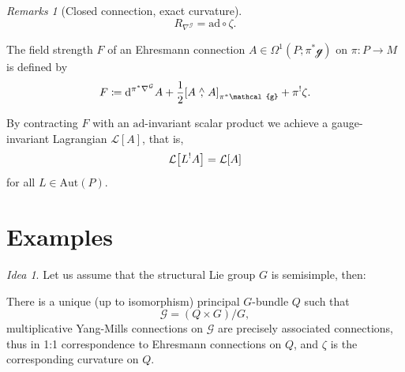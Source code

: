 \documentclass[
aspectratio=3218, 
10pt
]{beamer}
\def\bes{\begin{equation*}}
\def\ees{\end{equation*}}
\theoremstyle{plain}
\theoremstyle{remark}
\newtheorem*{remark}{Remarks}
\newtheorem*{idea}{Idea}
\begin{document}
{\begin{frame}
\pause

\begin{remark}[Closed connection, exact curvature]
\bes
R_{\nabla^{\mathcal{G}}} = \mathup{ad} \circ \zeta.
\ees
\end{remark}
\end{frame}

\begin{frame}
\begin{definition}\vspace{.5pt}
The field strength $F$ of an Ehresmann connection $A \in \Omega^1(P; \pi^*\mathcal{g})$ on $\pi \colon P \to M$ is defined by 
\bes
F
\coloneqq
\mathrm{d}^{\pi^*\nabla^{\mathcal{G}}} A
	+ \frac{1}{2} \mleft[ A \stackrel{\wedge}{,} A \mright]_{\pi^*\mathcal{g}}
	+ \pi^!\zeta.
\ees
\end{definition}
\pause
\begin{theorem}\vspace{.5pt}
By contracting $F$ with an $\mathup{ad}$-invariant scalar product we achieve a gauge-invariant Lagrangian $\mathcal{L}[A]$, that is,
\bes
\mathcal{L}\mleft[L^!A\mright]
=
\mathcal{L}[A]
\ees
for all $L \in \mathup{Aut}(P)$.
\end{theorem}
\end{frame}

\section{Examples}


\begin{frame}
\begin{idea}
Let us assume that the structural Lie group $G$ is semisimple, then:
\end{idea}

\begin{theorem}\vspace{.5pt}
There is a unique (up to isomorphism) principal $G$-bundle $Q$ such that 
\bes
\mathcal{G} = (Q\times G) \Big/ G,
\ees
multiplicative Yang-Mills connections on $\mathcal{G}$ are precisely associated connections, thus in 1:1 correspondence to Ehresmann connections on $Q$, and $\zeta$ is the corresponding curvature on $Q$.
\end{theorem}
\end{frame}

}
\end{document}
